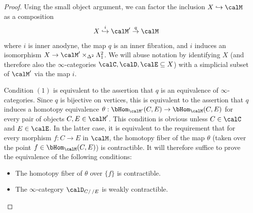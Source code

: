 \begin{proof}
Using the small object argument, we can factor the inclusion $X \hookrightarrow \calM$
as a composition
$$ X \stackrel{i}{\hookrightarrow} \calM' \stackrel{q}{\rightarrow} \calM$$
where $i$ is inner anodyne, the map $q$ is an inner fibration, and 
$i$ induces an isomorphism $X \rightarrow \calM' \times_{ \Delta^2} \Lambda^2_1$.
We will abuse notation by identifying $X$ (and therefore also the $\infty$-categories
$\calC, \calD, \calE \subseteq X$) with a simplicial subset of $\calM'$ via the map $i$.

Condition $(1)$ is equivalent to the assertion that $q$ is 
an equivalence of $\infty$-categories. Since $q$ is bijective on vertices, this is equivalent to the assertion that $q$ induces a homotopy equivalence $\theta: \bHom_{\calM'}(C,E) \rightarrow
\bHom_{\calM}(C,E)$ for every pair of objects $C,E \in \calM'$. This condition is obvious
unless $C \in \calC$ and $E \in \calE$. In the latter case, it is equivalent to the requirement that 
for every morphism $f: C \rightarrow E$ in $\calM$, the homotopy fiber of the map
$\theta$ (taken over the point $f \in \bHom_{\calM}(C,E)$) is contractible. It will therefore
suffice to prove the equivalence of the following conditions:
\begin{itemize}
\item[$(1')$] The homotopy fiber of $\theta$ over $\{f\}$ is contractible.
\item[$(2')$] The $\infty$-category $\calD_{C/ \, /E}$ is weakly contractible.
\end{itemize}


\end{proof}
